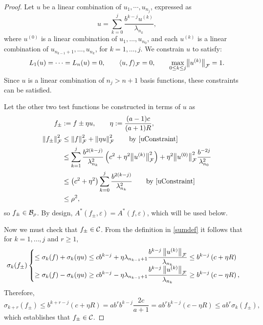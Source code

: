 \documentclass[graybox,footinfo]{svmult}
\newcommand{\DHJRnorm}[2][{}]{\ensuremath{\left \lVert #2 \right \rVert}_{#1}}
\newcommand{\DHJRbignorm}[2][{}]{\ensuremath{\bigl \lVert #2 \bigr \rVert}_{#1}}
\begin{document}
\begin{proof}
Let $u$ be a linear combination of $u_1, \cdots, u_{n_j}$, expressed as
\[
u =  \sum_{k=0}^{j}\frac{b^{k-j}u^{(k)}}{\lambda_{n_k}},
\]
where $u^{(0)}$ is a linear combination of $u_{1}, \ldots, u_{n_0}$, and each $u^{(k)}$ is a linear combination of $u_{n_{k-1}+1}, \ldots, u_{n_k}$, for $k =1, \ldots, j$.  We constrain $u$ to satisfy:
\begin{equation}\label{uConstraint}
L_1(u) = \cdots = L_n(u) = 0, \qquad \langle u,f \rangle_{\calF} = 0, \qquad 
\max_{0\le k\le j} \DHJRbignorm[\calF]{u^{(k)}} = 1.
\end{equation}
Since $u$ is a linear combination of $n_j >n+1$ basis functions, these constraints can be satisfied.

Let the other two test functions be constructed in terms of $u$ as 
\begin{align}
\label{etadef}
f_\pm & := f \pm \eta u, \qquad \eta : =  \frac {(a-1)c}{(a+1)R}, \\
\nonumber
\DHJRnorm[\calF]{f_\pm}^2 & \le \DHJRnorm[\calF]{f}^2 + \DHJRnorm[\calF]{\eta u }^2 \qquad \text{by \eqref{uConstraint}} \\
& \le \sum_{k=1}^j \frac{ b^{2(k-j)}}{\lambda^2_{n_{k}}} \left(c^2+ \eta^2 \DHJRbignorm[\calF]{u^{(k)}}^2\right) + \eta^2 \DHJRbignorm[\calF]{u^{(0)}}^2 \frac{b^{-2j}}{\lambda_{n_0}^2}\\
\nonumber
& \le  \left(c^2+ \eta^2 \right) \sum_{k=0}^j \frac{ b^{2(k-j)}}{\lambda^2_{n_{k}}}  \qquad \text{by \eqref{uConstraint}}\\
&  \le \rho^2,
\end{align} 
so $f_{\pm} \in {\mathcal{B}}_{\rho}$.  By design, $A^*(f_\pm,\varepsilon) = A^*(f,\varepsilon)$, which will be used below.

Now we must check that $f_\pm \in {\mathcal{C}}$. From the definition in \eqref{sumdef} it follows that for $k = 1, \ldots, j$ and $r \ge 1$,
\begin{equation*}
\sigma_k(f_\pm)  \begin{cases} 
\displaystyle
\le \sigma_k(f) + \sigma_k(\eta u)\le 
c b^{k-j} + \eta\lambda_{n_{k-1}+1}\frac{b^{k-j}\DHJRnorm[\calF]{u^{(k)} } }{\lambda_{n_k}}
\le b^{k-j}\left(c+\eta R \right) 
\\[1ex]
\displaystyle
\ge \sigma_k(f) - \sigma_k(\eta u)\ge 
c b^{k-j} - \eta\lambda_{n_{k-1}+1}\frac{b^{k-j}\DHJRnorm[\calF]{u^{(k)} } }{\lambda_{n_k}}
\ge b^{k-j}\left(c-\eta R \right) , 
\end{cases}
\end{equation*}
Therefore, 
\begin{equation*}
\sigma_{k+r}(f_\pm)
\le b^{k+r-j}(c+\eta R) = ab^r b^{k-j}\frac{2c}{a+1}
=ab^r b^{k-j}\left(c-\eta R \right) \le a b^r \sigma_{k}(f_\pm),
\end{equation*}
which establishes that $f_\pm \in {\mathcal{C}}$.


\end{proof}
\end{document}
